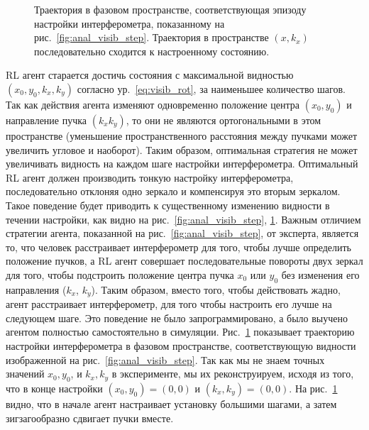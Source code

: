 \begin{figure}[ht]
\caption{Траектория в фазовом пространстве, соответствующая эпизоду настройки интерферометра, показанному на рис.~\ref{fig:anal_visib_step}. Траектория в пространстве $(x, k_x)$ последовательно сходится к настроенному состоянию.}
\label{fig:anal_kx}
\end{figure}

RL агент старается достичь состояния с максимальной видностью  $(x_0,y_0,k_x,k_y)$ согласно ур.~\eqref{eq:visib_rot}, за наименьшее количество шагов. Так как действия агента изменяют одновременно положение центра $(x_0, y_0)$ и направление пучка $(k_x k_y)$, то они не являются ортогональными в этом пространстве (уменьшение пространственного расстояния между пучками может увеличить угловое и наоборот). Таким образом, оптимальная стратегия не может увеличивать видность на каждом шаге настройки интерферометра. Оптимальный RL агент должен производить тонкую настройку интерферометра, последовательно отклоняя одно зеркало и компенсируя это вторым зеркалом. Такое поведение будет приводить к существенному изменению видности в течении настройки, как видно на рис.~\ref{fig:anal_visib_step}, \ref{fig:anal_kx}. Важным отличием стратегии агента, показанной на рис.~\ref{fig:anal_visib_step}, от эксперта, является то, что человек расстраивает интерферометр для того, чтобы лучше определить положение пучков, а RL агент совершает последовательные повороты двух зеркал для того, чтобы подстроить положение центра пучка $x_0$ или $y_0$ без изменения его направления ($k_x$, $k_y$). Таким образом, вместо того, чтобы действовать жадно, агент расстраивает интерферометр, для того чтобы настроить его лучше на следующем шаге. Это поведение не было запрограммировано, а было выучено агентом полностью самостоятельно в симуляции.  Рис.~\ref{fig:anal_kx} показывает траекторию настройки интерферометра в фазовом пространстве, соответствующую видности изображенной на рис.~\ref{fig:anal_visib_step}. Так как мы не знаем точных значений  $x_0, y_0$, и $k_x, k_y$ в эксперименте, мы их реконструируем, исходя из того, что в конце настройки $(x_0, y_0) = (0, 0)$ и $(k_x, k_y) = (0, 0)$. На рис.~\ref{fig:anal_kx} видно, что в начале агент настраивает установку большими шагами, а затем зигзагообразно сдвигает пучки вместе.

